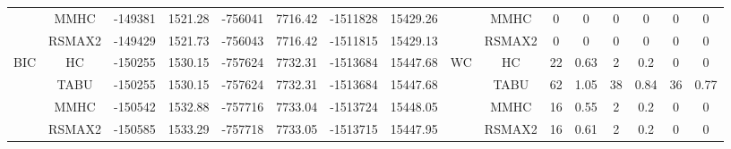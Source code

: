\begin{table}[p]
{\begin{tabular}{cc||cc|cc|cc||cc|cc|cc|cc}
& MMHC &	-149381 & 	1521.28 & 	-756041 & 	7716.42 & 	-1511828 & 	15429.26 & 	& MMHC &	0 & 	0 & 	0 & 	0 & 	0 & 	0\tabularnewline													
& RSMAX2 &	-149429 & 	1521.73 & 	-756043 & 	7716.42 & 	-1511815 & 	15429.13 & 	& RSMAX2 &	0 & 	0 & 	0 & 	0 & 	0 & 	0\tabularnewline													
\hline																										
\multirow{4}{*}{BIC} & HC &	-150255 & 	1530.15 & 	-757624 & 	7732.31 & 	-1513684 & 	15447.68 & 	\multirow{4}{*}{WC} & HC &	22 & 	0.63 & 	2 & 	0.2 & 	0 & 	0\tabularnewline													
& TABU &	-150255 & 	1530.15 & 	-757624 & 	7732.31 & 	-1513684 & 	15447.68 & 	& TABU &	62 & 	1.05 & 	38 & 	0.84 & 	36 & 	0.77\tabularnewline													
& MMHC &	-150542 & 	1532.88 & 	-757716 & 	7733.04 & 	-1513724 & 	15448.05 & 	& MMHC &	16 & 	0.55 & 	2 & 	0.2 & 	0 & 	0\tabularnewline													
& RSMAX2 &	-150585 & 	1533.29 & 	-757718 & 	7733.05 & 	-1513715 & 	15447.95 & 	& RSMAX2 &	16 & 	0.61 & 	2 & 	0.2 & 	0 & 	0\tabularnewline													
\hline																										
\end{tabular}																										
}																										
\end{table}																										


